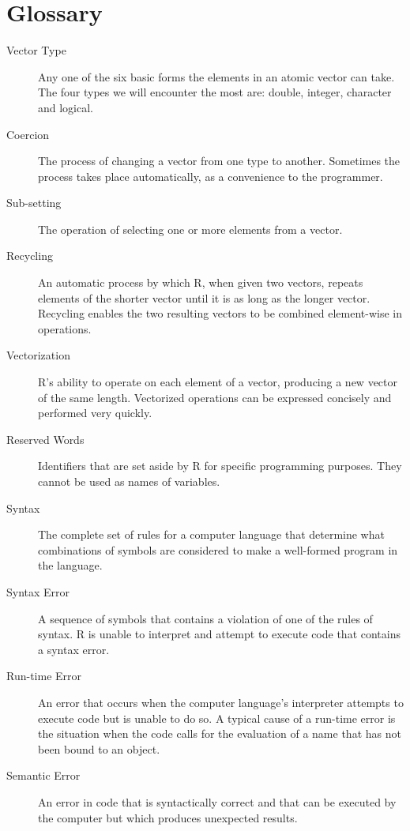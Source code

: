 \documentclass[]{book}
\theoremstyle{definition}
\theoremstyle{definition}
\theoremstyle{definition}
\theoremstyle{remark}
\begin{document}
{\newpage

\section*{Glossary}\label{glossary}

\begin{description}
\item[Vector Type]
Any one of the six basic forms the elements in an atomic vector can
take. The four types we will encounter the most are: double, integer,
character and logical.
\item[Coercion]
The process of changing a vector from one type to another. Sometimes the
process takes place automatically, as a convenience to the programmer.
\item[Sub-setting]
The operation of selecting one or more elements from a vector.
\item[Recycling]
An automatic process by which R, when given two vectors, repeats
elements of the shorter vector until it is as long as the longer vector.
Recycling enables the two resulting vectors to be combined element-wise
in operations.
\item[Vectorization]
R's ability to operate on each element of a vector, producing a new
vector of the same length. Vectorized operations can be expressed
concisely and performed very quickly.
\item[Reserved Words]
Identifiers that are set aside by R for specific programming purposes.
They cannot be used as names of variables.
\item[Syntax]
The complete set of rules for a computer language that determine what
combinations of symbols are considered to make a well-formed program in
the language.
\item[Syntax Error]
A sequence of symbols that contains a violation of one of the rules of
syntax. R is unable to interpret and attempt to execute code that
contains a syntax error.
\item[Run-time Error]
An error that occurs when the computer language's interpreter attempts
to execute code but is unable to do so. A typical cause of a run-time
error is the situation when the code calls for the evaluation of a name
that has not been bound to an object.
\item[Semantic Error]
An error in code that is syntactically correct and that can be executed
by the computer but which produces unexpected results.
\end{description}

}
\end{document}
